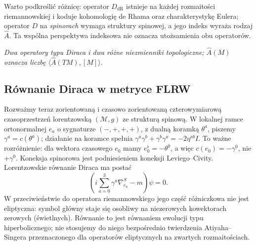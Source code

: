 Warto podkreślić różnicę: operator $D_{\mathrm{dR}}$
istnieje na każdej rozmaitości riemannowskiej
i koduje kohomologię de Rhama oraz charakterystykę
Eulera; operator $D$ na \emph{spinorach} wymaga
struktury spinowej, a jego indeks wyraża rodzaj
$\widehat A$. Ta wspólna perspektywa indeksowa
nie oznacza utożsamienia obu operatorów.

\begin{center}

{\small\itshape Dwa operatory typu Diraca i dwa różne
niezmienniki topologiczne; $\widehat A(M)$ oznacza
liczbę $\langle\widehat A(TM),[M]\rangle$.}
\end{center}

\subsection{Równanie Diraca w metryce FLRW}

Rozważmy teraz zorientowaną i czasowo zorientowaną
czterowymiarową czasoprzestrzeń lorentzowską
$(\mathcal M,g)$ ze strukturą spinową. W lokalnej ramce ortonormalnej $e_a$ o sygnaturze
$(-,+,+,+)$, z dualną koramką $\theta^a$, piszemy
$\gamma^a=c(\theta^a)$; działanie na koramce spełnia
$\gamma^a\gamma^b+\gamma^b\gamma^a=-2\eta^{ab}I$.
To ważne rozróżnienie: dla wektora czasowego
$e_0$ mamy $e_0^\flat=-\theta^0$, a więc
$c(e_0)=-\gamma^0$, nie $+\gamma^0$.
Koneksja spinorowa jest podniesieniem koneksji
Leviego--Civity. Lorentzowskie równanie Diraca ma postać
\begin{equation}\label{eq:dirac-zakrzywiony}
 \left(i\sum_{a=0}^3\gamma^a\nabla^S_{e_a}-m\right)\psi=0.
\end{equation}
W przeciwieństwie do operatora riemannowskiego
jego część różniczkowa nie jest eliptyczna:
symbol główny staje się osobliwy na niezerowych
kowektorach zerowych (świetlnych). Równanie to
jest równaniem ewolucji typu hiperbolicznego;
nie stosujemy do niego bezpośrednio twierdzenia
Atiyaha--Singera przeznaczonego dla operatorów
eliptycznych na zwartych rozmaitościach.

